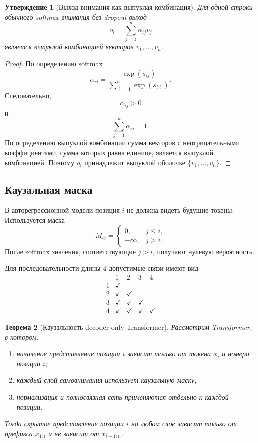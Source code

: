 \documentclass[12pt,a4paper]{article}
\newcommand{\1}{\mathbf{1}}
\newtheorem{theorem}{Теорема}[section]
\newtheorem{proposition}[theorem]{Утверждение}
\theoremstyle{definition}
\theoremstyle{remark}
\begin{document}
\begin{proposition}[Выход внимания как выпуклая комбинация]
Для одной строки обычного softmax-внимания без dropout выход
\[
o_i=\sum_{j=1}^{n}\alpha_{ij}v_j
\]
является выпуклой комбинацией векторов $v_1,\ldots,v_n$.
\end{proposition}

\begin{proof}
По определению softmax
\[
\alpha_{ij}
=
\frac{\exp(s_{ij})}
{\sum_{\ell=1}^{n}\exp(s_{i\ell})}.
\]
Следовательно,
\[
\alpha_{ij}>0
\]
и
\[
\sum_{j=1}^{n}\alpha_{ij}=1.
\]
По определению выпуклой комбинации сумма векторов с неотрицательными
коэффициентами, сумма которых равна единице, является выпуклой
комбинацией. Поэтому $o_i$ принадлежит выпуклой оболочке
$\{v_1,\ldots,v_n\}$.
\end{proof}

\subsection{Каузальная маска}

В авторегрессионной модели позиция $i$ не должна видеть будущие токены.
Используется маска
\[
M_{ij}
=
\begin{cases}
0,&j\leq i,\\
-\infty,&j>i.
\end{cases}
\]
После softmax значения, соответствующие $j>i$, получают нулевую
вероятность.

Для последовательности длины $4$ допустимые связи имеют вид
\[
\begin{array}{c|cccc}
 &1&2&3&4\\
\hline
1&\checkmark&&&\\
2&\checkmark&\checkmark&&\\
3&\checkmark&\checkmark&\checkmark&\\
4&\checkmark&\checkmark&\checkmark&\checkmark
\end{array}
\]

\begin{theorem}[Каузальность decoder-only Transformer]
Рассмотрим Transformer, в котором:

\begin{enumerate}
    \item начальное представление позиции $i$ зависит только от токена
    $x_i$ и номера позиции $i$;
    \item каждый слой самовнимания использует каузальную маску;
    \item нормализация и полносвязная сеть применяются отдельно к каждой
    позиции.
\end{enumerate}

Тогда скрытое представление позиции $i$ на любом слое зависит только от
префикса $x_{1:i}$ и не зависит от $x_{i+1:n}$.
\end{theorem}
\end{document}
